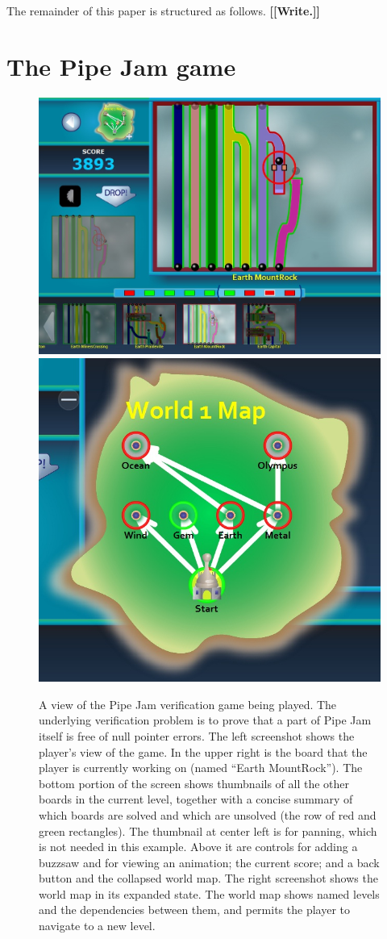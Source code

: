 \documentclass[preprint]{sig-alternate}
\newcommand{\todo}[1]{{\color{red}\bfseries [[#1]]}}
\begin{document}
\medskip

The remainder of this paper is structured as follows.
\todo{Write.}




\section{The Pipe Jam game}
\label{sec:pipejam}


\begin{figure}
\begin{center}
\includegraphics[width=.49\textwidth]{images/allUI-world1}%
\hfill%
\includegraphics[width=.35\textwidth]{images/world-map}
\end{center}

\caption{
  A view of the Pipe Jam verification game being played.  The underlying
  verification problem is to prove that a part of Pipe Jam itself is free of
  null pointer errors.
  \newline
  The left screenshot shows the player's view of the game.  In the
  upper right is the board that the player is currently working on
  (named ``Earth MountRock'').  The bottom portion of the screen shows
  thumbnails of all the other boards in the current level, together
  with a concise summary of which boards are solved and which are
  unsolved (the row of red and green rectangles).  The thumbnail at
  center left is for panning, which is not needed in this example.
  Above it are controls for adding a buzzsaw and for viewing an
  animation; the current score; and a back button and the collapsed
  world map.
  \newline
  The right screenshot shows the world map in its expanded state.  The
  world map shows named levels and the dependencies between them, and 
  permits the player to navigate to a new level.
}
\label{fig:game-overview}
\end{figure}
\end{document}

